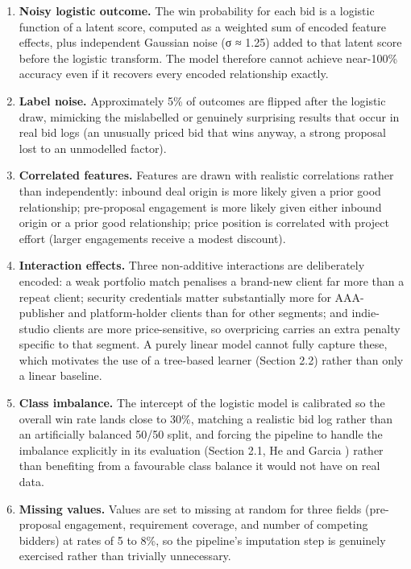 \documentclass[12pt,oneside]{report}
\providecommand{\tightlist}{%
  \setlength{\itemsep}{0pt}\setlength{\parskip}{0pt}}
\begin{document}
\begin{enumerate}
\def\labelenumi{\arabic{enumi}.}
\tightlist
\item
  \textbf{Noisy logistic outcome.} The win probability for each bid is a
  logistic function of a latent score, computed as a weighted sum of
  encoded feature effects, plus independent Gaussian noise (σ ≈ 1.25)
  added to that latent score before the logistic transform. The model
  therefore cannot achieve near-100\% accuracy even if it recovers every
  encoded relationship exactly.
\item
  \textbf{Label noise.} Approximately 5\% of outcomes are flipped after
  the logistic draw, mimicking the mislabelled or genuinely surprising
  results that occur in real bid logs (an unusually priced bid that wins
  anyway, a strong proposal lost to an unmodelled factor).
\item
  \textbf{Correlated features.} Features are drawn with realistic
  correlations rather than independently: inbound deal origin is more
  likely given a prior good relationship; pre-proposal engagement is
  more likely given either inbound origin or a prior good relationship;
  price position is correlated with project effort (larger engagements
  receive a modest discount).
\item
  \textbf{Interaction effects.} Three non-additive interactions are
  deliberately encoded: a weak portfolio match penalises a brand-new
  client far more than a repeat client; security credentials matter
  substantially more for AAA-publisher and platform-holder clients than
  for other segments; and indie-studio clients are more price-sensitive,
  so overpricing carries an extra penalty specific to that segment. A
  purely linear model cannot fully capture these, which motivates the
  use of a tree-based learner (Section 2.2) rather than only a linear
  baseline.
\item
  \textbf{Class imbalance.} The intercept of the logistic model is
  calibrated so the overall win rate lands close to 30\%, matching a
  realistic bid log rather than an artificially balanced 50/50 split,
  and forcing the pipeline to handle the imbalance explicitly in its
  evaluation (Section 2.1, He and Garcia \citep{he2009learning}) rather
  than benefiting from a favourable class balance it would not have on
  real data.
\item
  \textbf{Missing values.} Values are set to missing at random for three
  fields (pre-proposal engagement, requirement coverage, and number of
  competing bidders) at rates of 5 to 8\%, so the pipeline's imputation
  step is genuinely exercised rather than trivially unnecessary.
\end{enumerate}
\end{document}
